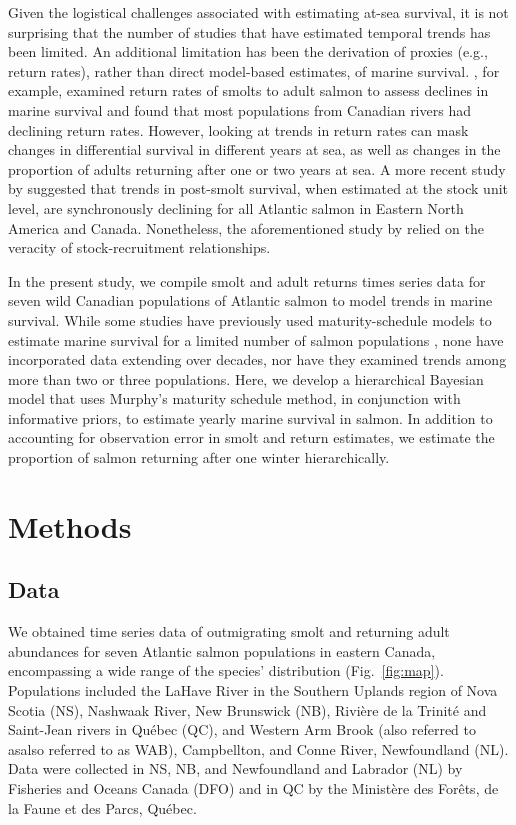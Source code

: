 \documentclass[12pt]{article}
\begin{document}
Given the logistical challenges associated with estimating at-sea survival, it
is not surprising that the number of studies that have estimated temporal
trends has been limited. An additional limitation has been the derivation of
proxies (e.g., return rates), rather than direct model-based estimates, of
marine survival.
\citet{Chaput2012a}, for example, examined return rates of smolts to adult salmon to assess
declines in marine survival and found that most populations from Canadian
rivers had declining return rates. 
However, looking at trends in return rates
can mask changes in differential survival in different years at sea, as well
as changes in the proportion of adults returning after one or two years at sea.
A more recent study by \citet{Olmos2019} suggested that trends in post-smolt
survival, when estimated at the stock unit level, are synchronously declining
for all Atlantic salmon in Eastern North America and Canada. Nonetheless,
the aforementioned study by \citet{Olmos2019} relied on the veracity of stock-recruitment relationships.

In the present study, we compile smolt and adult returns times series data for seven wild
Canadian populations of Atlantic salmon to model trends in marine survival.
While some studies have previously used maturity-schedule models to estimate marine
survival for a limited number of salmon populations \citep{Chaput2003b}, none
have incorporated data extending over decades, nor have they examined
trends among more than two or three populations. 
Here, we develop a hierarchical Bayesian model that uses Murphy's maturity
schedule method, in conjunction with informative priors, to estimate yearly
marine survival in salmon. In addition to accounting for observation error in
smolt and return estimates, we estimate the proportion of salmon returning
after one winter hierarchically.

\section*{Methods}

\subsection*{Data}

We obtained time series data of outmigrating smolt and returning adult
abundances for seven Atlantic salmon populations in eastern Canada, encompassing a
wide range of the species' distribution (Fig.~\ref{fig:map}). 
Populations included the LaHave River in the Southern Uplands region of Nova
Scotia (NS), Nashwaak River, New Brunswick (NB), Rivi\`{e}re de la Trinit\'{e} and
Saint-Jean rivers in Qu\'{e}bec (QC), and  Western Arm Brook (also referred to asalso referred to as  WAB), Campbellton, and
Conne River, Newfoundland (NL). 
Data were collected in NS, NB, and Newfoundland
and Labrador (NL) by Fisheries and Oceans Canada (DFO) and in QC
by the Minist\`{e}re des For\^{e}ts, de la Faune et des Parcs, Qu\'{e}bec.
\end{document}

